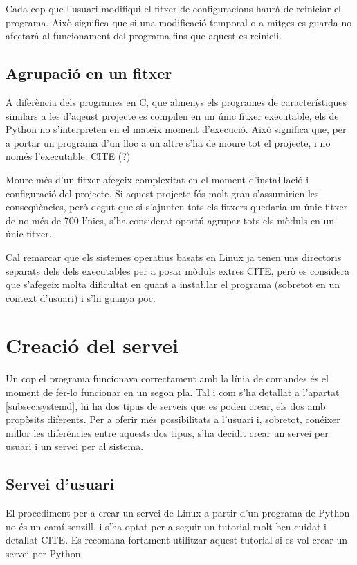 Cada cop que l'usuari modifiqui el fitxer de configuracions haurà de reiniciar
el programa. Això significa que si una modificació temporal o a mitges es guarda
no afectarà al funcionament del programa fins que aquest es reinicii.

\subsection{Agrupació en un fitxer}

A diferència dels programes en C, que almenys els programes de característiques
similars a les d'aqeust projecte es compilen en un únic fitxer executable, els
 de Python no s'interpreten en el mateix moment d'execució. Això
significa que, per a portar un programa d'un lloc a un altre s'ha de moure tot
el projecte, i no només l'executable. CITE (?)

Moure més d'un fitxer afegeix complexitat en el moment d'insta\l.lació i
configuració del projecte. Si aquest projecte fós molt gran s'assumirien les
conseqüències, però degut que si s'ajunten tots els fitxers quedaria un únic
fitxer de no més de 700 línies, s'ha considerat oportú agrupar tots els mòduls
en un únic fitxer.

Cal remarcar que els sistemes operatius basats en Linux ja tenen uns directoris
separats dels dels executables per a posar mòduls extres CITE, però es considera que
s'afegeix molta dificultat en quant a insta\l.lar el programa (sobretot en un
context d'usuari) i s'hi guanya poc.

\section{Creació del servei }

Un cop el programa funcionava correctament amb la línia de comandes és el moment
de fer-lo funcionar en un segon pla. Tal i com s'ha detallat a l'apartat
\ref{subsec:systemd}, hi ha dos tipus de serveis que es poden crear, els dos
amb propòsits diferents. Per a oferir més possibilitats a l'usuari i, sobretot,
conéixer millor les diferències entre aquests dos tipus, s'ha decidit crear
un servei per usuari i un servei per al sistema.

\subsection{Servei d'usuari}

El procediment per a crear un servei de Linux a partir d'un programa de Python
no és un camí senzill, i s'ha optat per a seguir un tutorial molt ben cuidat i
detallat CITE. Es recomana fortament utilitzar aquest tutorial si es vol crear
un servei per Python.

